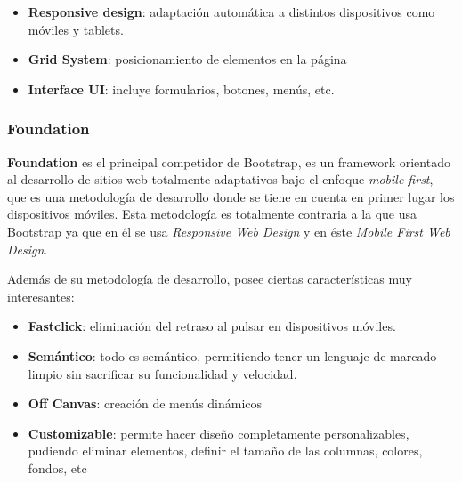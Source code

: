         
        \begin{itemize}
            \item \textbf{Responsive design}: adaptación automática a distintos dispositivos
            como móviles y tablets.
            \item \textbf{Grid System}: posicionamiento de elementos en la página
            \item \textbf{Interface UI}: incluye formularios, botones, menús, etc.
        \end{itemize}
        
        \subsubsection{Foundation}
        \textbf{Foundation} \cite{foundation} es el principal competidor de Bootstrap, es un
        framework orientado al desarrollo de sitios web totalmente adaptativos bajo el enfoque
        \textit{mobile first}, que es una metodología de desarrollo donde se tiene en cuenta
        en primer lugar los dispositivos móviles. Esta metodología es totalmente contraria a
        la que usa Bootstrap ya que en él se usa \textit{Responsive Web Design} y en éste
        \textit{Mobile First Web Design}.
        
        Además de su metodología de desarrollo, posee ciertas características muy interesantes:
        
        \begin{itemize}
            \item \textbf{Fastclick}: eliminación del retraso al pulsar en dispositivos
            móviles.
            \item \textbf{Semántico}: todo es semántico, permitiendo tener un lenguaje de
            marcado limpio sin sacrificar su funcionalidad y velocidad.
            \item \textbf{Off Canvas}: creación de menús dinámicos
            \item \textbf{Customizable}: permite hacer diseño completamente personalizables,
            pudiendo eliminar elementos, definir el tamaño de las columnas, colores,
            fondos, etc
        \end{itemize}

